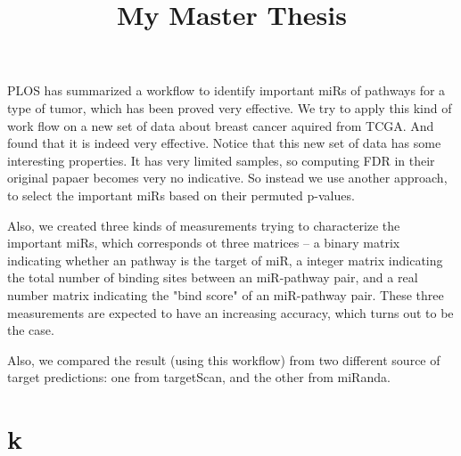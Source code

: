 \documentclass{scrartcl}
\title{My Master Thesis}
\begin{document}
\maketitle
\begin{abstruct}
  PLOS has summarized a workflow\cite{???} to identify important miRs of
  pathways for a type of tumor, which has been proved very effective. We try to
  apply this kind of work flow on a new set of data about breast cancer aquired
  from TCGA. And found that it is indeed very effective. Notice that this new
  set of data has some interesting properties. It has very limited samples, so
  computing FDR in their original papaer becomes very no indicative. So instead
  we use another approach, to select the important miRs based on their permuted
  p-values.

  Also, we created three kinds of measurements trying to characterize the
  important miRs, which corresponds ot three matrices -- a binary matrix
  indicating whether an pathway is the target of miR, a integer matrix
  indicating the total number of binding sites between an miR-pathway pair, and
  a real number matrix indicating the "bind score" of an miR-pathway pair.
  These three measurements are expected to have an increasing accuracy, which
  turns out to be the case.

  Also, we compared the result (using this workflow) from two different source
  of target predictions: one from targetScan\cite{???}, and the other from
  miRanda\cite{???}.

\end{abstruct}
\section{k}
\end{document}

